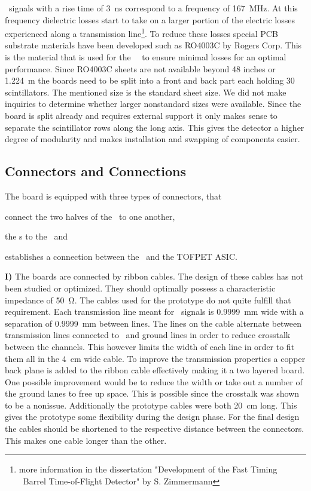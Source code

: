 \documentclass[../BTOF_summary.tex]{subfiles}
\begin{document}
\sipm\ signals with a rise time of \SI{3}{ns} correspond to a frequency of \SI{167}{MHz}.
At this frequency dielectric losses start to take on a larger portion of the electric losses experienced along a transmission line\footnote{more information in the dissertation "Development of the Fast Timing \panda\ Barrel Time-of-Flight Detector" by S. Zimmermann}.
To reduce these losses special PCB substrate materials have been developed such as RO4003C by Rogers Corp.
This is the material that is used for the \btof\ \railboard\ to ensure minimal losses for an optimal performance.
Since RO4003C sheets are not available beyond 48 inches or \SI{1.224}{m} the boards need to be split into a front and back part each holding 30 scintillators.
The mentioned size is the standard sheet size.
We did not make inquiries to determine whether larger nonstandard sizes were available.
Since the board is split already and requires external support it only makes sense to separate the scintillator rows along the long axis.
This gives the detector a higher degree of modularity and makes installation and swapping of components easier.

\subsection{Connectors and Connections}

The board is equipped with three types of connectors, that 
\begin{enumerate*}[label=\textbf{\Roman*})]
	\item  connect the two halves of the \railboard\ to one another, 
	\item the \sensorboard s to the \railboard\ and 
	\item establishes a connection between the \railboard\ and the TOFPET ASIC.
\end{enumerate*}

\textbf{I)} 
The boards are connected by ribbon cables.
The design of these cables has not been studied or optimized.
They should optimally possess a characteristic impedance of \SI{50}{\ohm}.
The cables used for the prototype do not quite fulfill that requirement.
Each transmission line meant for \sipm\ signals is \SI{0.9999}{mm} wide with a separation of \SI{0.9999}{mm} between lines.
The lines on the cable alternate between transmission lines connected to \sipms\ and ground lines in order to reduce crosstalk between the channels.
This however limits the width of each line in order to fit them all in the \SI{4}{cm} wide cable.
To improve the transmission properties a copper back plane is added to the ribbon cable effectively making it a two layered board.
One possible improvement would be to reduce the width or take out a number of the ground lanes to free up space.
This is possible since the crosstalk was shown to be a nonissue.
Additionally the prototype cables were both \SI{20}{cm} long.
This gives the prototype some flexibility during the design phase.
For the final design the cables should be shortened to the respective distance between the connectors.
This makes one cable longer than the other.
\end{document}
